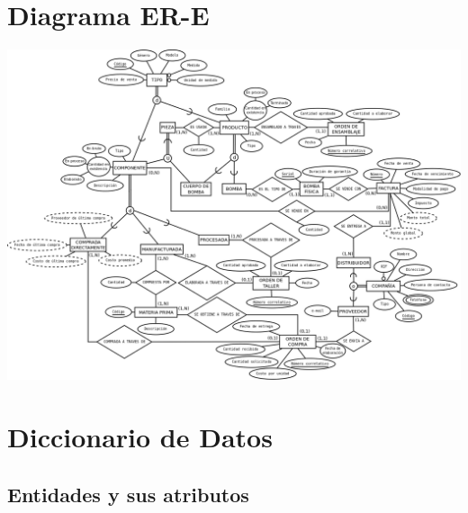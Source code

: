 \documentclass[]{report}
\begin{document}
	\chapter*{Diagrama ER-E}
	\begin{center}
		\includegraphics[width=\textwidth,height=\textheight,keepaspectratio]{DiagramFINAL}
	\end{center}
	
	\chapter*{Diccionario de Datos}
	 \section*{\centering Entidades y sus atributos}
	
\end{document}

